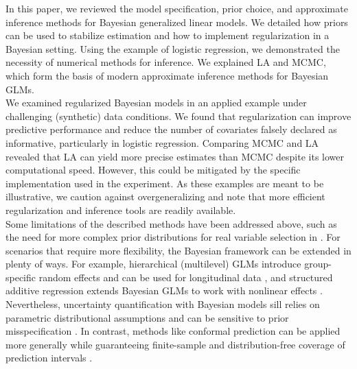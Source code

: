 In this paper, we reviewed the model specification, prior choice, and approximate inference methods for Bayesian generalized linear models.
We detailed how priors can be used to stabilize estimation and how to implement regularization in a Bayesian setting.
Using the example of logistic regression, we demonstrated the necessity of numerical methods for inference.
We explained LA and MCMC, which form the basis of modern approximate inference methods for Bayesian GLMs.\\

We examined regularized Bayesian models in an applied example under challenging (synthetic) data conditions.
We found that regularization can improve predictive performance and reduce the number of covariates falsely declared as informative, particularly in logistic regression.
Comparing MCMC and LA revealed that LA can yield more precise estimates than MCMC despite its lower computational speed.
However, this could be mitigated by the specific implementation used in the experiment.
As these examples are meant to be illustrative, we caution against overgeneralizing and note that more efficient regularization and inference tools are readily available.\\

Some limitations of the described methods have been addressed above, such as the need for more complex prior distributions for real variable selection in .
For scenarios that require more flexibility, the Bayesian framework can be extended in plenty of ways.
For example, 
hierarchical (multilevel) GLMs introduce group-specific random effects and can be used for longitudinal data \citep{gelman_weakly_2008}, and structured additive regression extends Bayesian GLMs to work with nonlinear effects \citep{fahrmeir_bayesian_2010}.
Nevertheless, uncertainty quantification with Bayesian models sill relies on parametric distributional assumptions and can be sensitive to prior misspecification \citep{piironen_comparison_2017}. In contrast, methods like conformal prediction can be applied more generally while guaranteeing finite-sample and  distribution-free coverage of prediction intervals \citep[see e.g.][]{angelopoulos_gentle_2022}.